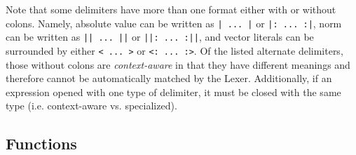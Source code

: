 \documentclass{article}
\begin{document}
  Note that some delimiters have more than one format either with or without colons. Namely, absolute value can be
  written as \texttt{| ...~|} or \texttt{|: ...~:|}, norm can be written as \texttt{|| ...~||} or \texttt{||: ...~:||},
  and vector literals can be surrounded by either \texttt{< ...~>} or \texttt{<: ...~:>}. Of the listed alternate
  delimiters, those without colons are \emph{context-aware} in that they have different meanings and therefore cannot be automatically
  matched by the Lexer. Additionally, if an expression opened with one type of delimiter, it must be closed with the
  same type (i.e. context-aware vs. specialized).

  \newpage

  \subsection{Functions} %
  \label{sub:functions}
\end{document}
